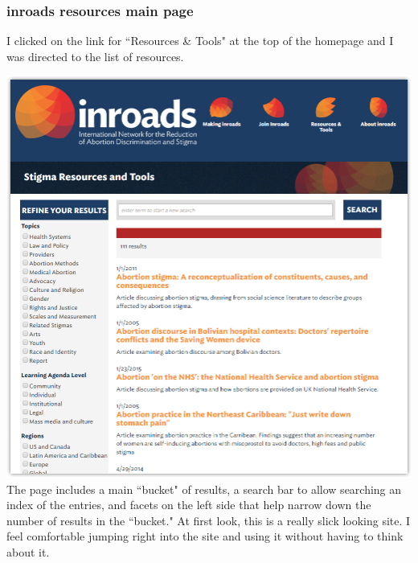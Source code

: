 \documentclass{article}
\begin{document}
\subsubsection{inroads resources main page}
I clicked on the link for ``Resources \& Tools" at the top of the homepage and I was directed to the list of resources.

\noindent\includegraphics[width=\textwidth]{2016-06-06-inroads}
The page includes a main ``bucket" of results, a search bar to allow searching an index of the entries, and facets on the left side that help narrow down the number of results in the ``bucket." At first look, this is a really slick looking site. I feel comfortable jumping right into the site and using it without having to think about it. 
\end{document}
